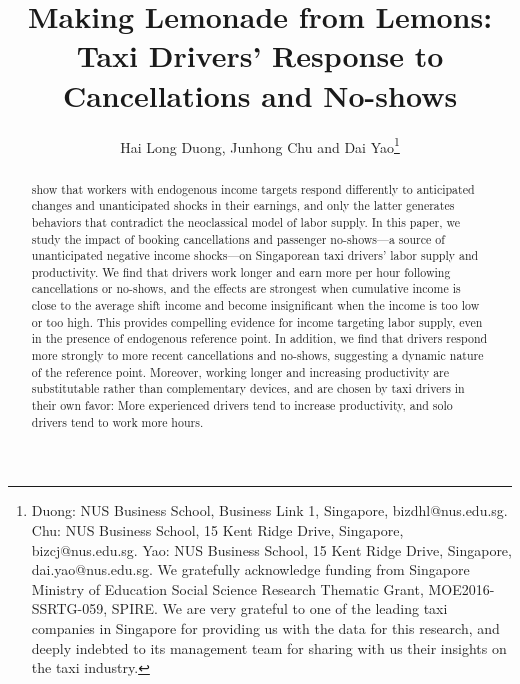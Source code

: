\documentclass[reviewmode]{restat}
\begin{document}

\title{Making Lemonade from Lemons: Taxi Drivers' Response to Cancellations and No-shows}
\author{Hai Long Duong, Junhong Chu and Dai Yao\thanks{Duong: NUS Business School, Business Link 1, Singapore, bizdhl@nus.edu.sg. Chu: NUS Business School, 15 Kent Ridge Drive, Singapore, bizcj@nus.edu.sg. Yao: NUS Business School, 15 Kent Ridge Drive, Singapore, dai.yao@nus.edu.sg. We gratefully acknowledge funding from Singapore Ministry of Education Social Science Research Thematic Grant, MOE2016-SSRTG-059, SPIRE. We are very grateful to one of the leading taxi companies in Singapore for providing us with the data for this research, and deeply indebted to its management team for sharing with us their insights on the taxi industry.}}


\begin{abstract}
	\citet{kHoszegi2006model} show that workers with endogenous income targets respond differently
	to anticipated changes and unanticipated shocks in their earnings, and only the latter generates
	behaviors that contradict the neoclassical model of labor supply. In this paper, we study the
	impact of booking cancellations and passenger no-shows---a source of unanticipated negative 
	income shocks---on Singaporean taxi drivers' labor supply and productivity. We find that 
	drivers work longer and earn more per hour following cancellations or no-shows, and the 
    effects are strongest when cumulative income is close to the average shift income and become 
    insignificant when the income is too low or too high. This provides 
	compelling evidence for income targeting labor supply, even in the presence of endogenous 
	reference point. In addition, we find that drivers respond more strongly to more recent 
	cancellations and no-shows, suggesting a dynamic nature of the reference point. Moreover, 
	working longer and increasing productivity are substitutable rather than complementary devices, 
	and are chosen by taxi drivers in their own favor: More experienced drivers tend to increase 
	productivity, and solo drivers tend to work more hours. 
\end{abstract}
\end{document}
